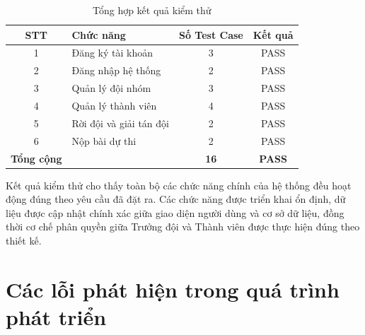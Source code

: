 \begin{table}[H]
	\centering
	\caption{Tổng hợp kết quả kiểm thử}
	\label{tab:test-summary}
	\renewcommand{\arraystretch}{1.3}
	
	\begin{tabular}{|c|p{7cm}|c|c|}
		\hline
		
		\textbf{STT} &
		\textbf{Chức năng} &
		\textbf{Số Test Case} &
		\textbf{Kết quả}
		
		\\
		\hline
		
		1 &
		Đăng ký tài khoản &
		3 &
		PASS
		
		\\
		\hline
		
		2 &
		Đăng nhập hệ thống &
		2 &
		PASS
		
		\\
		\hline
		
		3 &
		Quản lý đội nhóm &
		3 &
		PASS
		
		\\
		\hline
		
		4 &
		Quản lý thành viên &
		4 &
		PASS
		
		\\
		\hline
		
		5 &
		Rời đội và giải tán đội &
		2 &
		PASS
		
		\\
		\hline
		
		6 &
		Nộp bài dự thi &
		2 &
		PASS
		
		\\
		\hline
		
		\textbf{Tổng cộng} &
		&
		\textbf{16}
		&
		\textbf{PASS}
		
		\\
		\hline
		
	\end{tabular}
	
\end{table}

Kết quả kiểm thử cho thấy toàn bộ các chức năng chính của hệ thống đều hoạt động đúng theo yêu cầu đã đặt ra. Các chức năng được triển khai ổn định, dữ liệu được cập nhật chính xác giữa giao diện người dùng và cơ sở dữ liệu, đồng thời cơ chế phân quyền giữa Trưởng đội và Thành viên được thực hiện đúng theo thiết kế.

\section{Các lỗi phát hiện trong quá trình phát triển}

